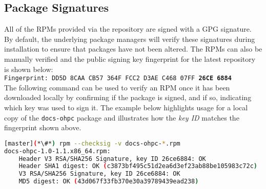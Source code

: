 \clearpage
\subsection{Package Signatures}

All of the RPMs provided via the \OHPC{} repository are signed with a GPG
signature. By default, the underlying package managers will verify these signatures during
installation to ensure that packages have not been altered. The RPMs can also
be manually verified and the public signing key fingerprint for the latest
repository is shown below: \\

\texttt{Fingerprint: DD5D 8CAA CB57 364F FCC2  D3AE C468 07FF {\bf26CE 6884}} \\

\noindent The following command can be used to verify an RPM once it
has been downloaded locally by confirming if the package is signed, and if so,
indicating which key was used to sign it.  The example below highlights usage
for a local copy of the \texttt{docs-ohpc} package and illustrates how the {\em
key ID} matches the fingerprint shown above.

\begin{lstlisting}[language=bash,keywords={}]
[master](*\#*) rpm --checksig -v docs-ohpc-*.rpm
docs-ohpc-1.0-1.1.x86_64.rpm:
    Header V3 RSA/SHA256 Signature, key ID 26ce6884: OK
    Header SHA1 digest: OK (c3873bf495c51d2ea6d3ef23ab88be105983c72c)
    V3 RSA/SHA256 Signature, key ID 26ce6884: OK
    MD5 digest: OK (43d067f33fb370e30a39789439ead238)
\end{lstlisting}



